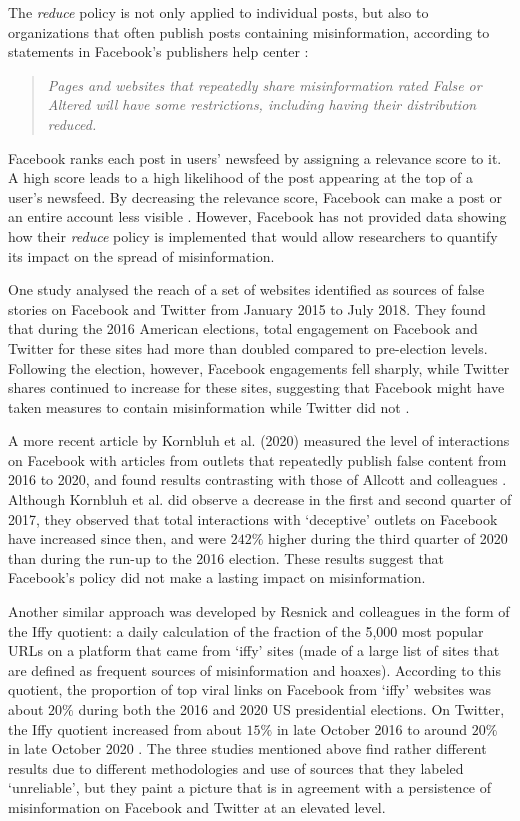 \documentclass[review]{elsarticle}
\begin{document}
The \textit{reduce} policy is not only applied to individual posts, but also to organizations that often publish posts containing misinformation, according to statements in Facebook’s publishers help center \citep{factCheckingRules, repeatOffenderCommunication}:
\begin{quote}
\emph{Pages and websites that repeatedly share misinformation rated False or Altered will have some restrictions, including having their distribution reduced.}
\end{quote}

Facebook ranks each post in users’ newsfeed by assigning a relevance score to it. 
A high score leads to a high likelihood of the post appearing at the top of a user's newsfeed. 
By decreasing the relevance score, Facebook can make a post or an entire account less visible \citep{threePartRecipe}.
However, Facebook has not provided data showing how their {\it reduce} policy is implemented that would allow researchers to quantify its impact on the spread of misinformation. 

One study analysed the reach of a set of websites identified as sources of false stories on Facebook and Twitter from January 2015 to July 2018. 
They found that during the 2016 American elections, total engagement on Facebook and Twitter for these sites had more than doubled compared to pre-election levels. 
Following the election, however, Facebook engagements fell sharply, while Twitter shares continued to increase for these sites, suggesting that Facebook might have taken measures to contain misinformation while Twitter did not \cite{allcott2019trends}. 

A more recent article by Kornbluh et al. (2020) \cite{kornbluh2020new} measured the level of interactions on Facebook with articles from outlets that repeatedly publish false content from 2016 to 2020, and found results contrasting with those of Allcott and colleagues \cite{allcott2019trends}. 
Although Kornbluh et al. did observe a decrease in the first and second quarter of 2017, they observed that total interactions with ‘deceptive’ outlets on Facebook have increased since then, and were $242\%$ higher during the third quarter of 2020 than during the run-up to the 2016 election. 
These results suggest that Facebook’s policy did not make a lasting impact on misinformation. 

Another similar approach was developed by Resnick and colleagues \cite{resnick2018iffy} in the form of the Iffy quotient: a daily calculation of the fraction of the 5,000 most popular URLs on a platform that came from `iffy' sites (made of a large list of sites that are defined as frequent sources of misinformation and hoaxes). 
According to this quotient, the proportion of top viral links on Facebook from `iffy' websites was about $20\%$ during both the 2016 and 2020 US presidential elections. 
On Twitter, the Iffy quotient increased from about $15\%$ in late October 2016 to around $20\%$ in late October 2020 \cite{IffyQuotient}. 
The three studies mentioned above find rather different results due to different methodologies and use of sources that they labeled `unreliable', but they paint a picture that is in agreement with a persistence of misinformation on Facebook and Twitter at an elevated level.
\end{document}
